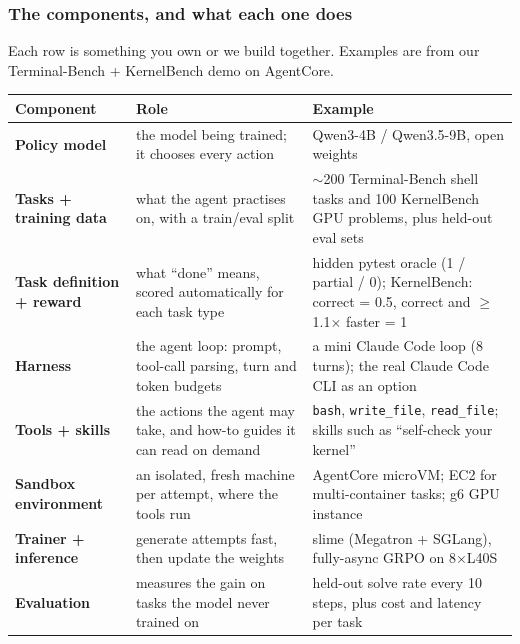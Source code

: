 \begin{frame}
\frametitle{The components, and what each one does}
\vspace{-1mm}
{\small\color{inkmuted}Each row is something you own or we build together. Examples are from our Terminal-Bench + KernelBench demo on AgentCore.\par}
\vspace{2mm}
\fontsize{7}{8.6}\selectfont
\renewcommand{\arraystretch}{1.26}
\begin{tabularx}{\textwidth}{@{}>{\raggedright\arraybackslash}p{27mm}>{\raggedright\arraybackslash}X>{\raggedright\arraybackslash}X@{}}
\toprule
\textcolor{awsteal}{\textbf{Component}} & \textcolor{awsteal}{\textbf{Role}} & \textcolor{awsteal}{\textbf{Example}}\\
\midrule
\textbf{Policy model} & the model being trained; it chooses every action & Qwen3-4B / Qwen3.5-9B, open weights\\
\textbf{Tasks + training data} & what the agent practises on, with a train/eval split & $\sim$200 Terminal-Bench shell tasks and 100 KernelBench GPU problems, plus held-out eval sets\\
\textbf{Task definition + reward} & what ``done'' means, scored automatically for each task type & hidden pytest oracle (1 / partial / 0); KernelBench: correct = 0.5, correct and $\geq$1.1$\times$ faster = 1\\
\textbf{Harness} & the agent loop: prompt, tool-call parsing, turn and token budgets & a mini Claude Code loop (8 turns); the real Claude Code CLI as an option\\
\textbf{Tools + skills} & the actions the agent may take, and how-to guides it can read on demand & \texttt{bash}, \texttt{write\_file}, \texttt{read\_file}; skills such as ``self-check your kernel''\\
\textbf{Sandbox environment} & an isolated, fresh machine per attempt, where the tools run & AgentCore microVM; EC2 for multi-container tasks; g6 GPU instance\\
\textbf{Trainer + inference} & generate attempts fast, then update the weights & slime (Megatron + SGLang), fully-async GRPO on 8$\times$L40S\\
\textbf{Evaluation} & measures the gain on tasks the model never trained on & held-out solve rate every 10 steps, plus cost and latency per task\\
\bottomrule
\end{tabularx}
\end{frame}

